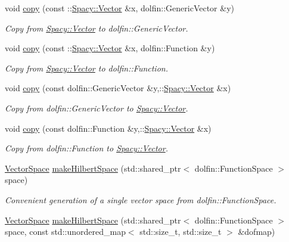 \begin{DoxyCompactItemize}
void \hyperlink{group__FenicsGroup_ga7f43f0c660d0646adb031b453c536bb0}{copy} (const \-::\hyperlink{classSpacy_1_1Vector}{Spacy\-::\-Vector} \&x, dolfin\-::\-Generic\-Vector \&y)
\begin{DoxyCompactList}\small\item\em Copy from \hyperlink{classSpacy_1_1Vector}{Spacy\-::\-Vector} to dolfin\-::\-Generic\-Vector. \end{DoxyCompactList}\item 
void \hyperlink{group__FenicsGroup_ga28fb1ebae29e07ec0256bb2331599aa7}{copy} (const \-::\hyperlink{classSpacy_1_1Vector}{Spacy\-::\-Vector} \&x, dolfin\-::\-Function \&y)
\begin{DoxyCompactList}\small\item\em Copy from \hyperlink{classSpacy_1_1Vector}{Spacy\-::\-Vector} to dolfin\-::\-Function. \end{DoxyCompactList}\item 
void \hyperlink{group__FenicsGroup_ga61c5e45dbb789c155fbf86f8ec288f17}{copy} (const dolfin\-::\-Generic\-Vector \&y,\-::\hyperlink{classSpacy_1_1Vector}{Spacy\-::\-Vector} \&x)
\begin{DoxyCompactList}\small\item\em Copy from dolfin\-::\-Generic\-Vector to \hyperlink{classSpacy_1_1Vector}{Spacy\-::\-Vector}. \end{DoxyCompactList}\item 
void \hyperlink{namespaceSpacy_1_1FEniCS_a7c4519bd0cbdc4e72b71f273bade591e}{copy} (const dolfin\-::\-Function \&y,\-::\hyperlink{classSpacy_1_1Vector}{Spacy\-::\-Vector} \&x)
\begin{DoxyCompactList}\small\item\em Copy from dolfin\-::\-Function to \hyperlink{classSpacy_1_1Vector}{Spacy\-::\-Vector}. \end{DoxyCompactList}\item 
\hyperlink{classSpacy_1_1VectorSpace}{Vector\-Space} \hyperlink{group__FenicsGroup_ga8b67cb3d0188d2398625595b79e2fa6a}{make\-Hilbert\-Space} (std\-::shared\-\_\-ptr$<$ dolfin\-::\-Function\-Space $>$ space)
\begin{DoxyCompactList}\small\item\em Convenient generation of a single vector space from dolfin\-::\-Function\-Space. \end{DoxyCompactList}\item 
\hyperlink{classSpacy_1_1VectorSpace}{Vector\-Space} \hyperlink{group__FenicsGroup_ga135620ce224178541cae896577f438dc}{make\-Hilbert\-Space} (std\-::shared\-\_\-ptr$<$ dolfin\-::\-Function\-Space $>$ space, const std\-::unordered\-\_\-map$<$ std\-::size\-\_\-t, std\-::size\-\_\-t $>$ \&dofmap)

\end{DoxyCompactItemize}
